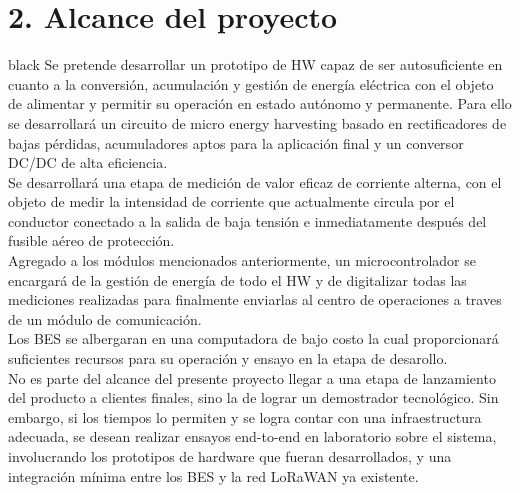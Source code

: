 \documentclass[11pt]{charter}
\begin{document}
\section{2. Alcance del proyecto}
\label{sec:alcance}

\begin{consigna}{black}
Se pretende desarrollar un prototipo de HW capaz de ser autosuficiente en cuanto a la conversión, acumulación y gestión de energía eléctrica con el objeto de alimentar y permitir su operación en estado autónomo y permanente. Para ello se desarrollará un circuito de micro energy harvesting basado en rectificadores de bajas pérdidas, acumuladores aptos para la aplicación final y un conversor DC/DC de alta eficiencia.\\
Se desarrollará una etapa de medición de valor eficaz de corriente alterna, con el objeto de medir la intensidad de corriente que actualmente circula por el conductor conectado a la salida de baja tensión e inmediatamente después del fusible aéreo de protección.\\
Agregado a los módulos mencionados anteriormente, un microcontrolador se encargará de la gestión de energía de todo el HW y de digitalizar todas las mediciones realizadas para finalmente enviarlas al centro de operaciones a traves de un módulo de comunicación.\\
Los BES se albergaran en una computadora de bajo costo la cual proporcionará suficientes recursos para su operación y ensayo en la etapa de desarollo.\\

No es parte del alcance del presente proyecto llegar a una etapa de lanzamiento del producto a clientes finales, sino la de lograr un demostrador tecnológico. Sin embargo, si los tiempos lo permiten y se logra contar con una infraestructura adecuada, se desean realizar ensayos end-to-end en laboratorio sobre el sistema, involucrando los prototipos de hardware que fueran desarrollados, y una integración mínima entre los BES y la red LoRaWAN ya existente.\\
\end{consigna}
\end{document}
